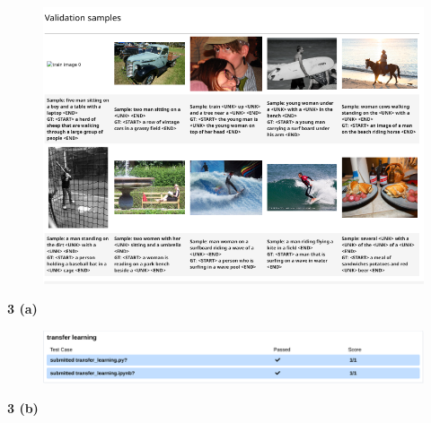 \documentclass[12 pt]{article}        	%
\begin{document}
\begin{figure}[h!]
  \includegraphics[width=0.7\linewidth]{captions_validation.png}
\end{figure}

\clearpage

\textbf{3 (a)}
\begin{figure}[h!]
  \includegraphics[width=\linewidth]{autograder_screenshot.png}
\end{figure}

\clearpage

\textbf{3 (b)}
\end{document}
